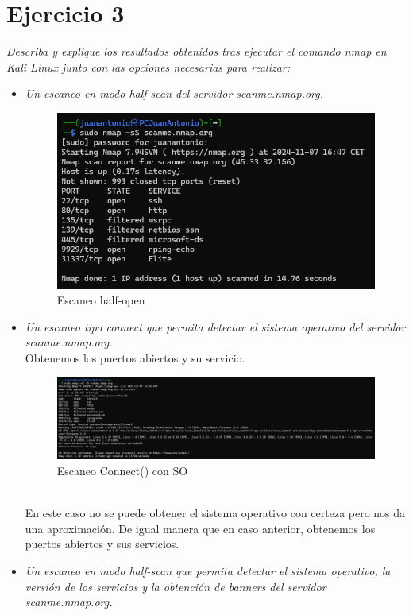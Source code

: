 \documentclass[12pt]{book}
\begin{document}
\section{Ejercicio 3}
\textit{Describa y explique los resultados obtenidos tras ejecutar el comando nmap en Kali
Linux junto con las opciones necesarias para realizar:}
\begin{itemize}
    \item\textit{Un escaneo en modo half-scan del servidor scanme.nmap.org.}\\
    \begin{figure}[h]
        \centering
        \includegraphics[width=0.7\linewidth]{Practica 3y4/images/Captura de pantalla 2024-11-07 164902.png}
        \caption{Escaneo half-open}
        \label{fig:enter-label}
    \end{figure}
    \item\textit{Un escaneo tipo connect que permita detectar el sistema operativo del servidor scanme.nmap.org.}\\
    Obtenemos los puertos abiertos y su servicio.
    \begin{figure}[h]
        \centering
        \includegraphics[width=\linewidth]{Practica 3y4/images/Captura de pantalla 2024-11-07 165209.png}
        \caption{Escaneo Connect() con SO}
        \label{fig:enter-label}
    \end{figure}
    \\
    En este caso no se puede obtener el sistema operativo con certeza pero nos da una aproximación. De igual manera que en caso anterior, obtenemos los puertos abiertos y sus servicios.
    \newpage
    \item\textit{Un escaneo en modo half-scan que permita detectar el sistema operativo, la versión de los servicios y la obtención de banners del servidor scanme.nmap.org.}\\

\end{itemize}
\end{document}
